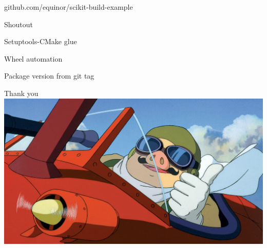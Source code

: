 \documentclass[pdf]{beamer}
\begin{document}
\begin{frame}
    \begin{center}
        \large{github.com/equinor/scikit-build-example}
    \end{center}
\end{frame}

\begin{frame}{Shoutout}
    \begin{description}[labelwidth=\widthof{\bfseries setuptools-scm}]
        \item [scikit-build] Setuptools-CMake glue
        \item [multibuild] Wheel automation
        \item [setuptools-scm] Package version from git tag
    \end{description}
\end{frame}

\begin{frame}{Thank you}
    \includegraphics[width = \textwidth]{img/porcorosso.jpg}
\end{frame}
\end{document}
